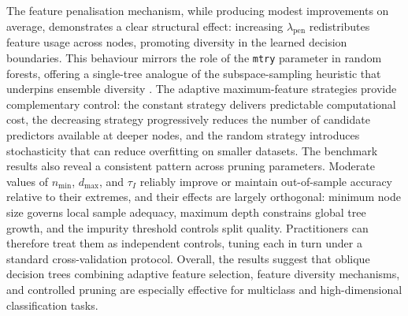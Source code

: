 The feature penalisation mechanism, while producing modest improvements on average, demonstrates a clear structural effect: increasing \(\lambda_{\text{pen}}\) redistributes feature usage across nodes, promoting diversity in the learned decision boundaries. This behaviour mirrors the role of the \texttt{mtry} parameter in random forests, offering a single-tree analogue of the subspace-sampling heuristic that underpins ensemble diversity \citep{breiman1984}. The adaptive maximum-feature strategies provide complementary control: the constant strategy delivers predictable computational cost, the decreasing strategy progressively reduces the number of candidate predictors available at deeper nodes, and the random strategy introduces stochasticity that can reduce overfitting on smaller datasets. The benchmark results also reveal a consistent pattern across pruning parameters. Moderate values of \(n_{\min}\), \(d_{\max}\), and \(\tau_I\) reliably improve or maintain out-of-sample accuracy relative to their extremes, and their effects are largely orthogonal: minimum node size governs local sample adequacy, maximum depth constrains global tree growth, and the impurity threshold controls split quality. Practitioners can therefore treat them as independent controls, tuning each in turn under a standard cross-validation protocol. Overall, the results suggest that oblique decision trees combining adaptive feature selection, feature diversity mechanisms, and controlled pruning are especially effective for multiclass and high-dimensional classification tasks.

